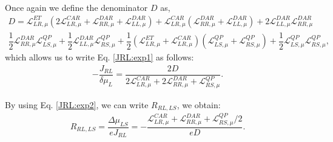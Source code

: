 Once again we define the denominator $D$ as,
\begin{align}\label{D:definition}
D=\mathcal{L}_{LR,\mu}^{ET}
(2\mathcal{L}_{LR,\mu}^{CAR}
+
\mathcal{L}_{RR,\mu}^{DAR}
+
\mathcal{L}_{LL,\mu}^{DAR})
+
\mathcal{L}_{LR,\mu}^{CAR}
(
\mathcal{L}_{RR,\mu}^{DAR}
+
\mathcal{L}_{LL,\mu}^{DAR}
)
+2\mathcal{L}_{LL,\mu}^{DAR}\mathcal{L}_{RR,\mu}^{DAR}
\\
\dfrac{1}{2}\mathcal{L}_{RR,\mu}^{DAR}\mathcal{L}^{QP}_{LS,\mu}
+\dfrac{1}{2}
\mathcal{L}_{LL,\mu}^{DAR}\mathcal{L}^{QP}_{RS,\mu}
+\dfrac{1}{2}
(\mathcal{L}_{LR,\mu}^{ET}+\mathcal{L}_{LR,\mu}^{CAR})(\mathcal{L}^{QP}_{LS,\mu}
+
\mathcal{L}^{QP}_{RS,\mu})
+\dfrac{1}{2}
\mathcal{L}^{QP}_{LS,\mu}\mathcal{L}^{QP}_{RS,\mu},
\end{align}
which allows us to write Eq. \eqref{JRL:exp1} as follows:
\begin{align}\label{JRL:exp2}
-\dfrac{J_{RL}}{\delta\mu_{L}}
=
\dfrac{2D}{2\mathcal{L}_{LR,\mu}^{CAR}
+
2\mathcal{L}_{RR,\mu}^{DAR}
+
\mathcal{L}^{QP}_{RS,\mu}}.
\end{align}

By using Eq. \eqref{JRL:exp2}, we can write $R_{RL,LS}$, we obtain:
\begin{align}
R_{RL,LS}=\dfrac{\Delta\mu_{LS}}{eJ_{RL}}
=
-\dfrac{\mathcal{L}_{LR,\mu}^{CAR}
+
\mathcal{L}_{RR,\mu}^{DAR}
+
\mathcal{L}^{QP}_{RS,\mu}/2}{eD}.
\end{align}